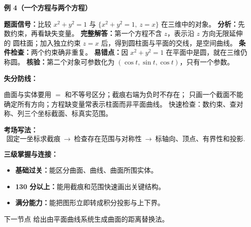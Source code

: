 \begin{knowledgeBox}
\textbf{例 4（一个方程与两个方程）}

\textbf{题面信号：}比较
\(x^2+y^2=1\) 与
\(\{x^2+y^2=1,\ z=x\}\) 在三维中的对象。
\textbf{分析：}先数约束，再看缺失变量。
\textbf{完整解答：}第一个方程不含 \(z\)，表示沿 \(z\) 方向无限延伸的
圆柱面；加入独立约束 \(z=x\) 后，得到圆柱面与平面的交线，是空间曲线。
\textbf{条件检查：}两个约束确非重复。
\textbf{易错点：}因 \(x^2+y^2=1\) 在平面中是圆，就在三维仍称圆。
\textbf{核验：}第二个对象可参数化为
\((\cos t,\sin t,\cos t)\)，只有一个参数。

\textbf{失分防线：}

曲面与实体要用 \(=\) 和不等号区分；截痕右端为负时不存在；
只画一个截面不能确定所有方向；方程缺变量常表示柱面而非平面曲线。
快速检查：数约束、查对称、列三个坐标截面、标真实范围。

\textbf{考场写法：}
\[
\boxed{\text{固定一坐标求截痕}\ \longrightarrow\
\text{检查存在范围与对称性}\ \longrightarrow\
\text{标轴向、顶点、有界性和投影}.}
\]

\textbf{三级掌握与连接：}
\begin{itemize}
  \item \textbf{基础过关：}能区分曲面、曲线、曲面所围实体。
  \item \textbf{130 分以上：}能用截痕和范围快速画出关键结构。
  \item \textbf{满分能力：}能把图形立即转成积分投影与上下界。
\end{itemize}
下一节点 
给出由平面曲线系统生成曲面的距离替换法。
\end{knowledgeBox}



